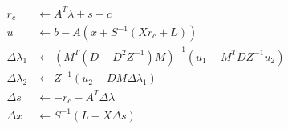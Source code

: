 \documentclass{article}
\begin{document}
\begin{align}
	r_c &\leftarrow A^T \lambda + s - c\\
	u &\leftarrow b - A(x + S^{-1}(Xr_c + L))\\
	\Delta \lambda_1 &\leftarrow (M^T(D-D^2Z^{-1})M)^{-1}(u_1 - M^TDZ^{-1}u_2)\\
	\Delta \lambda_2 &\leftarrow Z^{-1}(u_2 - DM\Delta\lambda_1) \\
	\Delta s &\leftarrow -r_c - A^T\Delta \lambda\\
	\Delta x &\leftarrow S^{-1}(L - X\Delta s)\\
\end{align}
\end{document}

